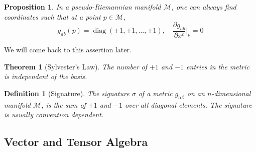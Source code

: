 \documentclass[a4paper]{article}
\DeclareMathOperator{\diag}{diag}
\theoremstyle{new}
\newtheorem{defi}{Definition}[section]
\newtheorem{thm}{Theorem}[section]
\newtheorem{prop}{Proposition}[section]
\begin{document}
\begin{prop}
In a pseudo-Riemannian manifold $\mathcal{M}$, one can always find coordinates such that at a point $p\in\mathcal{M}$,
$$g_{ab}(p)=\diag(\pm1,\pm1,\dots,\pm1),\quad\frac{\partial g_{ab}}{\partial x^c}\bigg|_p=0$$
\end{prop}
We will come back to this assertion later.
\begin{thm}[Sylvester's Law]
The number of $+1$ and $-1$ entries in the metric is independent of the basis.
\end{thm}
\begin{defi}[Signature]
The signature $\sigma$ of a metric $g_{\alpha\beta}$ on an $n$-dimensional manifold $\mathcal{M}$, is the sum of $+1$ and $-1$ over all diagonal elements. The signature is usually convention dependent.
\end{defi}
\newpage
\subsection{Vector and Tensor Algebra}
\end{document}
